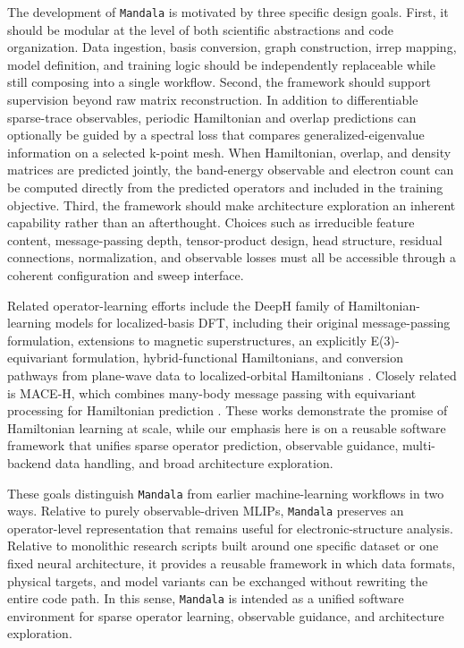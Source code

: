 \documentclass[preprint,12pt,compress,numafflabel]{elsarticle}
\begin{document}
The development of \texttt{Mandala} is motivated by three specific design goals. First, it should be modular at the level of both scientific abstractions and code organization. Data ingestion, basis conversion, graph construction, irrep mapping, model definition, and training logic should be independently replaceable while still composing into a single workflow. Second, the framework should support supervision beyond raw matrix reconstruction. In addition to differentiable sparse-trace observables, periodic Hamiltonian and overlap predictions can optionally be guided by a spectral loss that compares generalized-eigenvalue information on a selected k-point mesh. When Hamiltonian, overlap, and density matrices are predicted jointly, the band-energy observable and electron count can be computed directly from the predicted operators and included in the training objective. Third, the framework should make architecture exploration an inherent capability rather than an afterthought. Choices such as irreducible feature content, message-passing depth, tensor-product design, head structure, residual connections, normalization, and observable losses must all be accessible through a coherent configuration and sweep interface.

Related operator-learning efforts include the DeepH family of Hamiltonian-learning models for localized-basis DFT, including their original message-passing formulation, extensions to magnetic superstructures, an explicitly E(3)-equivariant formulation, hybrid-functional Hamiltonians, and conversion pathways from plane-wave data to localized-orbital Hamiltonians \cite{deeph2022,deeph_magnetic_2023,deephe3_2023,deeph_hybrid_2024,deeph_pw_2024,deeph_review_2025}. Closely related is MACE-H, which combines many-body message passing with equivariant processing for Hamiltonian prediction \cite{maceh_2026}. These works demonstrate the promise of Hamiltonian learning at scale, while our emphasis here is on a reusable software framework that unifies sparse operator prediction, observable guidance, multi-backend data handling, and broad architecture exploration.

These goals distinguish \texttt{Mandala} from earlier machine-learning workflows in two ways. Relative to purely observable-driven MLIPs, \texttt{Mandala} preserves an operator-level representation that remains useful for electronic-structure analysis. Relative to monolithic research scripts built around one specific dataset or one fixed neural architecture, it provides a reusable framework in which data formats, physical targets, and model variants can be exchanged without rewriting the entire code path. In this sense, \texttt{Mandala} is intended as a unified software environment for sparse operator learning, observable guidance, and architecture exploration.
\end{document}
